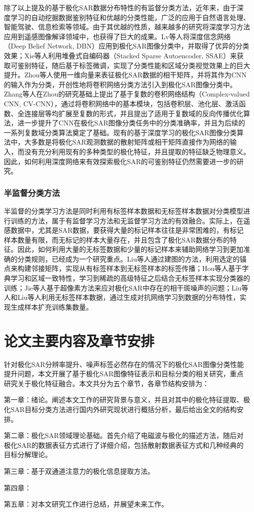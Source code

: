 除了以上提及的基于极化SAR数据分布特性的有监督分类方法，近年来，由于深度学习的自动挖掘数据鉴别特征和优越的分类性能，广泛的应用于自然语言处理、智能驾驶、信息检索等领域。由于其优越的性质，越来越多的研究将深度学习方法应用到遥感图像解译领域中，也获得了巨大的成果。Lv等人将深度信念网络（Deep Belief Network, DBN）应用到极化SAR图像分类中，并取得了优异的分类效果；Xie等人利用堆叠式自编码器（Stacked Sparse Autoencoder, SSAE）来获取可鉴别特征，随后基于标签微调，实现了分类性能和区域分类视觉效果上的巨大提升。Zhou等人使用一维向量来表征极化SAR数据的相干矩阵，并将其作为CNN的输入作为分类，开创性地将卷积网络分类方法引入到极化SAR图像分类中。Zhang等人在Zhou的研究基础上提出了基于复数的卷积网络结构（Complex-valued CNN, CV-CNN），通过将卷积网络中的基本模块，包括卷积层、池化层、激活函数、全连接层等均扩展至复数的形式，并且提出了适用于复数域的反向传播优化算法，进一步提升了CNN在极化SAR图像分类任务中的分类准确率，并且为后续的一系列复数域分类算法奠定了基础。现有的基于深度学习的极化SAR图像分类算法中，大多数是将极化SAR观测数据的散射矩阵或相干矩阵直接作为网络的输入，而没有充分利用现有的多种类型的极化特征，并且提取的特征缺乏物理意义。因此，如何利用深度网络来有效探索极化SAR的可鉴别特征仍然需要进一步的研究。

\subsubsection{半监督分类方法}
半监督的分类学习方法是同时利用有标签样本数据和无标签样本数据对分类模型进行训练的方法，属于有监督学习方法和无监督学习方法的有效融合。实际上，在遥感数据中，尤其是SAR数据，要获得大量的标记样本往往是非常困难的，有标记样本数量有限，而无标记的样本大量存在，并且包含了极化SAR数据分布的特征。因此，如何利用大量的无标签数据和少量的标记样本来辅助网络学习到更加准确的分类规则，已经成为一个研究重点。Liu等人通过建图的方法，利用选定的锚点来构建邻接矩阵，实现从有标签样本到无标签样本的标签传播；Hou等人基于字典学习和区域一致特性，学习到稀疏的高级特征之后结合无标签样本实现分类器的训练；Jie等人基于超像素方法来应对极化SAR中存在的相干斑噪声的问题；Liu等人和Liu等人利用无标签样本数据，通过生成对抗网络学习到数据的分布特性，实现生成样本扩充训练集数量。

\section{论文主要内容及章节安排}
针对极化SAR分辨率提升、噪声标签必然存在的情况下的极化SAR图像分类性能提升问题，本文开展了基于极化SAR图像特征表示和目标分类的相关研究，重点研究关于极化特征融合。本文共分为五个章节，各章节结构安排为：

第一章：绪论。阐述本文工作的研究背景与意义，并且对其中的极化特征提取、极化SAR目标分类方法进行国内外研究现状进行概括分析，最后给出全文的结构安排。

第二章：极化SAR领域理论基础。首先介绍了电磁波与极化的描述方法，随后对极化SAR的数据表征方式进行了详细介绍，包括散射数据表征方式和几种经典的目标分解理论。

第三章：基于双通道注意力的极化信息提取方法。

第四章：

第五章：对本文研究工作进行总结，并展望未来工作。